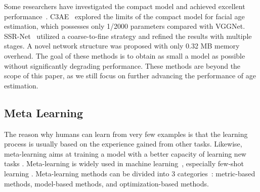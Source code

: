 \documentclass[journal,twoside]{IEEEtran}
\begin{document}
Some researchers have investigated the compact model and achieved excellent performance~\cite{zhang2019c3ae,yang2018ssr}.
C3AE~\cite{zhang2019c3ae} explored the limits of the compact model for facial age estimation, which possesses only 1/2000 parameters compared with VGGNet. SSR-Net~\cite{yang2018ssr} utilized a coarse-to-fine strategy and refined the results with multiple stages. A novel network structure was proposed with only 0.32 MB memory overhead. The goal of these methods is to obtain as small a model as possible without significantly degrading performance. These methods are beyond the scope of this paper, as we still focus on further advancing the performance of age estimation. 


\subsection{Meta Learning}
The reason why humans can learn from very few examples is that the learning process is usually based on the experience gained from other tasks. Likewise, meta-learning aims at training a model with a better capacity of learning new tasks \cite{lee2019meta}. Meta-learning is widely used in machine learning~\cite{munkhdalai2017meta,li2021meta}, especially few-shot learning \cite{snell2017prototypical}. Meta-learning methods can be divided into 3 categories~\cite{lee2019meta}: metric-based methods, model-based methods, and optimization-based methods.
\end{document}
